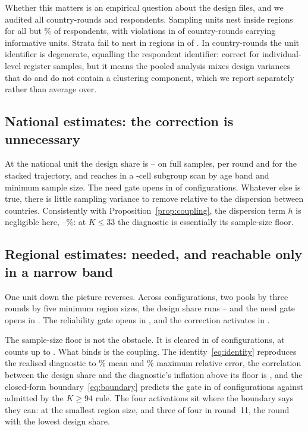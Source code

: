 Whether this matters is an empirical question about the design files, and we
audited all \AudCountryRounds{} country-rounds and \AudRespondents{}
respondents. Sampling units nest inside regions for all but \AudSplitShare\% of
respondents, with violations in \AudSplit{} of \AudInformative{} country-rounds
carrying informative units. Strata fail to nest in regions in
\AudStratumSplit{} of \AudCountryRounds. In \AudDegenerate{} country-rounds the
unit identifier is degenerate, equalling the respondent identifier: correct for
individual-level register samples, but it means the pooled analysis mixes
design variances that do and do not contain a clustering component, which we
report separately rather than average over.

\subsection{National estimates: the correction is unnecessary}
At the national unit the design share is \NatRhoLo--\NatRhoHi{} on full samples,
per round and for the stacked trajectory, and reaches \NatScanHi{} in a
\NatScanCells-cell subgroup scan by age band and minimum sample size. The need
gate opens in \NatGateA{} of \NatConfigs{} configurations. Whatever else is
true, there is little sampling variance to remove relative to the dispersion
between countries. Consistently with Proposition~\ref{prop:coupling}, the
dispersion term $h$ is negligible here, \NatHeteroLo--\NatHeteroHi\%: at
$K\le33$ the diagnostic is essentially its sample-size floor.

\subsection{Regional estimates: needed, and reachable only in a narrow band}
One unit down the picture reverses. Across \RegConfigs{} configurations, two
pools by three rounds by five minimum region sizes, the design share runs
\RegRhoLo--\RegRhoHi{} and the need gate opens in \RegGateA. The reliability
gate opens in \RegGateB, and the correction activates in \RegActivations.

The sample-size floor is not the obstacle. It is cleared in
\RegFloorCleared{} of \RegConfigs{} configurations, at counts up to \RegKmax.
What binds is the coupling. The identity~\eqref{eq:identity} reproduces the
realised diagnostic to \IdErr\% mean and \IdErrMax\% maximum relative error, the
correlation between the design share and the diagnostic's inflation above its
floor is \RegCorrRhoRatio, and the closed-form boundary~\eqref{eq:boundary}
predicts the gate in \BoundCorrect{} of \RegConfigs{} configurations against
\BoundNaive{} admitted by the $K\ge94$ rule. The four activations sit where the
boundary says they can: at the smallest region size, and three of four in
round~11, the round with the lowest design share.

